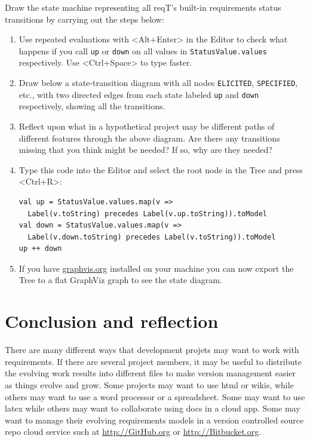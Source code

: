 \documentclass[11pt]{article}
\begin{document}
\newpage %
\begin{framed}
\noindent Draw the state machine representing all reqT's built-in requirements status transitions by carrying out the steps below:
\begin{enumerate}
\item Use repeated evaluations with <Alt+Enter> in the Editor to check what happens if you call \verb+up+ or  \verb+down+ on all values in \verb+StatusValue.values+ respectively. Use <Ctrl+Space> to type faster. 
\item Draw below a state-transition diagram with all nodes \verb+ELICITED+, \verb+SPECIFIED+, etc., with two directed edges from each state labeled \verb+up+ and \verb+down+ respectively, showing all the transitions. \newline
\vspace{7cm}
\item Reflect upon what in a hypothetical project may be different paths of different features through the above diagram. Are there any transitions missing that you think might be needed? If so, why are they needed?
\item Type this code into the Editor and select the root node in the Tree and press <Ctrl+R>:{\scriptsize\begin{verbatim}
val up = StatusValue.values.map(v => 
  Label(v.toString) precedes Label(v.up.toString)).toModel
val down = StatusValue.values.map(v => 
  Label(v.down.toString) precedes Label(v.toString)).toModel
up ++ down
\end{verbatim}}
\item If you have \url{graphvis.org} installed on your machine you can now export the Tree to a flat GraphViz graph to see the state diagram.
\end{enumerate}
\end{framed}


\section{Conclusion and reflection}

There are many different ways that development projets may want to work with requirements. If there are several project members, it may be useful to distribute the evolving work results into different files to make version management easier as things evolve and grow. Some projects may want to use html or wikis, while others may want to use a word processor or a spreadsheet. Some may want to use latex while others may want to collaborate using docs in a cloud app. Some may want to manage their evolving requirements models in a version controlled source repo cloud service such at \url{http://GitHub.org} or \url{http://Bitbucket.org}. 
\end{document}
